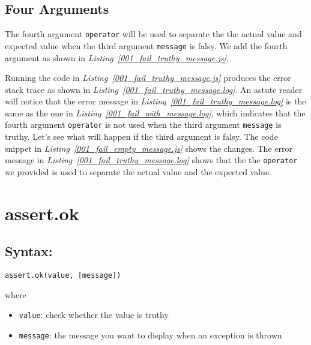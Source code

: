 \subsection{Four Arguments}
The fourth argument \texttt{operator} will be used to separate the the actual value and expected value when the third argument \texttt{message} is falsy. We add the fourth argument as shown in \textit{Listing~\ref{001_fail_truthy_message.js}}.

Running the code in \textit{Listing~\ref{001_fail_truthy_message.js}} produces the error stack trace as shown in \textit{Listing~\ref{001_fail_truthy_message.log}}.
An astute reader will notice that the error message in \textit{Listing~\ref{001_fail_truthy_message.log}} is the same as the one in \textit{Listing~\ref{001_fail_with_message.log}}, which indicates that the fourth argument \texttt{operator} is not used when the third argument \texttt{message} is truthy. Let's see what will happen if the third argument is falsy. The code snippet in \textit{Listing~\ref{001_fail_empty_message.js}} shows the changes.
The error message in \textit{Listing~\ref{001_fail_truthy_message.log}} shows that the the \texttt{operator} we provided is used to separate the actual value and the expected value.
\section{assert.ok}
\label{sec:assert.ok}
\subsection*{Syntax:}
\begin{center}\texttt{assert.ok(value, [message])}

\end{center}where
\begin{itemize}
\item \texttt{value}: check whether the value is truthy
\item \texttt{message}: the message you want to display when an exception is thrown
\end{itemize}

